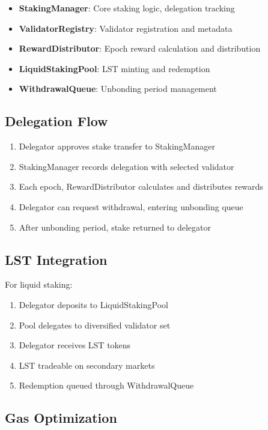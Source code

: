 \documentclass[11pt,a4paper]{article}
\theoremstyle{definition}
\theoremstyle{remark}
\begin{document}
\begin{itemize}
    \item \textbf{StakingManager}: Core staking logic, delegation tracking
    \item \textbf{ValidatorRegistry}: Validator registration and metadata
    \item \textbf{RewardDistributor}: Epoch reward calculation and distribution
    \item \textbf{LiquidStakingPool}: LST minting and redemption
    \item \textbf{WithdrawalQueue}: Unbonding period management
\end{itemize}

\subsection{Delegation Flow}

\begin{enumerate}
    \item Delegator approves stake transfer to StakingManager
    \item StakingManager records delegation with selected validator
    \item Each epoch, RewardDistributor calculates and distributes rewards
    \item Delegator can request withdrawal, entering unbonding queue
    \item After unbonding period, stake returned to delegator
\end{enumerate}

\subsection{LST Integration}

For liquid staking:
\begin{enumerate}
    \item Delegator deposits to LiquidStakingPool
    \item Pool delegates to diversified validator set
    \item Delegator receives LST tokens
    \item LST tradeable on secondary markets
    \item Redemption queued through WithdrawalQueue
\end{enumerate}

\subsection{Gas Optimization}
\end{document}
